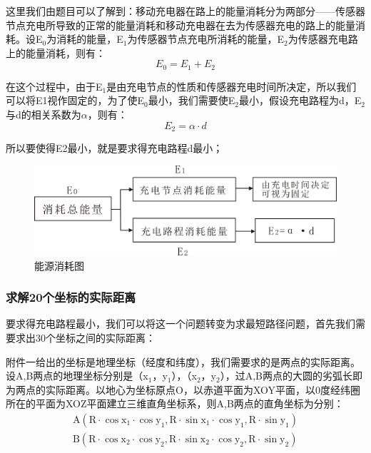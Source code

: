 \documentclass{article}
\begin{document}
这里我们由题目可以了解到：移动充电器在路上的能量消耗分为两部分——传感器节点充电所导致的正常的能量消耗和移动充电器在去为传感器充电的路上的能量消耗。设E$_0$为消耗的能量，E$_1$为传感器节点充电所消耗的能量，E$_2$为传感器充电路上的能量消耗，则有：
\begin{equation}
    E_0 = E_1 + E_2     %
    \tag{1}             %
\end{equation}      %

在这个过程中，由于E$_1$是由充电节点的性质和传感器充电时间所决定，所以我们可以将E1视作固定的，为了使E$_0$最小，我们需要使E$_2$最小，假设充电路程为d，E$_2$与d的相关系数为$\alpha$，则有：
\begin{equation}
    E_2 = \alpha \cdot d   %
    \tag{2}             
\end{equation}      

所以要使得E2最小，就是要求得充电路程d最小；

\begin{figure}[htp]%
    \centering
    \includegraphics[scale=0.5]{5.jpg}
    \caption{能源消耗图}
\end{figure}

\subsubsection{求解20个坐标的实际距离}
要求得充电路程最小，我们可以将这一个问题转变为求最短路径问题，首先我们需要求出30个坐标之间的实际距离\cite{ref4}：

附件一给出的坐标是地理坐标（经度和纬度），我们需要求的是两点的实际距离。设A,B两点的地理坐标分别是（x$_1$，y$_1$），（x$_2$，y$_2$），过A,B两点的大圆的劣弧长即为两点的实际距离。以地心为坐标原点O，以赤道平面为XOY平面，以0度经纬圈所在的平面为XOZ平面建立三维直角坐标系，则A,B两点的直角坐标为分别：
\begin{gather}    %
    \mathrm {A\left(R \cdot \cos x_1 \cdot \cos y_1, R \cdot \sin x_1 \cdot \cos y_1, R \cdot \sin y_1\right)} \tag{3} \\
    \mathrm {B\left(R \cdot \cos x_2 \cdot \cos y_2, R \cdot \sin x_2 \cdot \cos y_2, R \cdot \sin y_2\right)} \tag{4}            
\end{gather}    %
\end{document}
